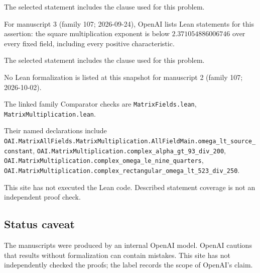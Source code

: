 \documentclass[11pt]{article}
\begin{document}
The selected statement includes the clause used for this problem.

For manuscript 3 (family 107; 2026-09-24), OpenAI lists Lean statements for this assertion: the square multiplication exponent is below $2.371054886006746$ over every fixed field, including every positive characteristic.

The selected statement includes the clause used for this problem.

No Lean formalization is listed at this snapshot for manuscript 2 (family 107; 2026-10-02).

The linked family Comparator checks are \texttt{MatrixFields.lean}, \texttt{MatrixMultiplication.lean}.

Their named declarations include \texttt{OAI.MatrixAllFields.MatrixMultiplication.AllFieldMain.omega\_lt\_source\_constant}, \texttt{OAI.MatrixMultiplication.complex\_alpha\_gt\_93\_div\_200}, \texttt{OAI.MatrixMultiplication.complex\_omega\_le\_nine\_quarters}, \texttt{OAI.MatrixMultiplication.complex\_rectangular\_omega\_lt\_523\_div\_250}.

This site has not executed the Lean code. Described statement coverage is not an independent proof check.

\subsection{Status caveat}
The manuscripts were produced by an internal OpenAI model. OpenAI cautions that results without formalization can contain mistakes. This site has not independently checked the proofs; the label records the scope of OpenAI's claim.
\end{document}
